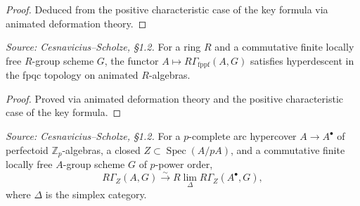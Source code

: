 \begin{proof}
  \uses{}
  Deduced from the positive characteristic case of the key formula via animated deformation theory.
\end{proof}

\begin{theorem}
  \label{thm:fpqc_descent}
  \textit{Source: Cesnavicius--Scholze, §1.2.}
  For a ring \(R\) and a commutative finite locally free \(R\)-group scheme \(G\), the functor \(A \mapsto R\Gamma_{\mathrm{fppf}}(A, G)\) satisfies hyperdescent in the fpqc topology on animated \(R\)-algebras.
\end{theorem}

\begin{proof}
  \uses{}
  Proved via animated deformation theory and the positive characteristic case of the key formula.
\end{proof}

\begin{theorem}
  \label{thm:arc_descent}
  \textit{Source: Cesnavicius--Scholze, §1.2.}
  For a \(p\)-complete arc hypercover \(A \to A^{\bullet}\) of perfectoid \(\mathbb{Z}_p\)-algebras, a closed \(Z \subset \operatorname{Spec}(A/pA)\), and a commutative finite locally free \(A\)-group scheme \(G\) of \(p\)-power order,
  \[
    R\Gamma_Z(A, G) \xrightarrow{\sim} R\lim_{\Delta} R\Gamma_Z(A^{\bullet}, G),
  \]
  where \(\Delta\) is the simplex category.
\end{theorem}

